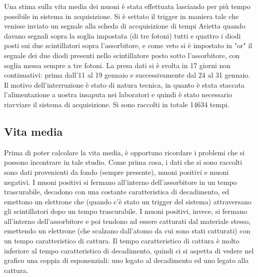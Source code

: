 Una stima sulla vita media dei muoni è stata effettuata lasciando per più tempo possibile in sistema in acquisizione. Si è settato il trigger in maniera tale che venisse inviato un segnale alla scheda di accquisizione di tempi Arietta quando davano segnali sopra la soglia  impostata (di tre fotoni) tutti e quattro i diodi posti sui due scintillatori sopra l'assorbitore, e come veto si è impostato in "or" il segnale dei due diodi presenti nello scintillatore posto sotto l'assorbitore, con soglia messa sempre a tre fotoni. La presa dati si è svolta in 17 giorni non continuativi: prima dall'11 al 19 gennaio e successivamente dal 24 al 31 gennaio. Il motivo dell'interruzione è stato di natura tecnica, in quanto è stata staccata l'alimentazione a nostra insaputa nei laboratori e quindi è stato necessario riavviare il sistema di acquisizione. Si sono raccolti in totale 14634 tempi.

\subsection{Vita media}
Prima di poter calcolare la vita  media, è opportuno ricordare i problemi che si possono incontrare in tale studio. Come prima cosa, i dati che si sono raccolti sono dati provenienti da fondo (sempre presente),  muoni positivi e muoni negativi. I muoni positivi si fermano all'interno dell'assorbitore in un tempo trascurabile, decadono con una costante caratteristica di decadimento, ed emettono un elettrone che (quando c'è stato un  trigger del sistema) attraversano gli scintillatori dopo un tempo trascurabile. I muoni positivi, invece, si fermano all'interno dell'assorbitore e poi tendono ad essere catturati dal materiale stesso, emettendo un elettrone (che scalzano dall'atomo da cui sono stati catturati) con un tempo caratteristico di cattura. Il tempo caratteristico di cattura è molto inferiore al tempo caratteristico di decadimento, quindi ci si aspetta di vedere nel grafico una coppia di esponenziali: uno legato al decadimento ed uno legato alla cattura.\\

